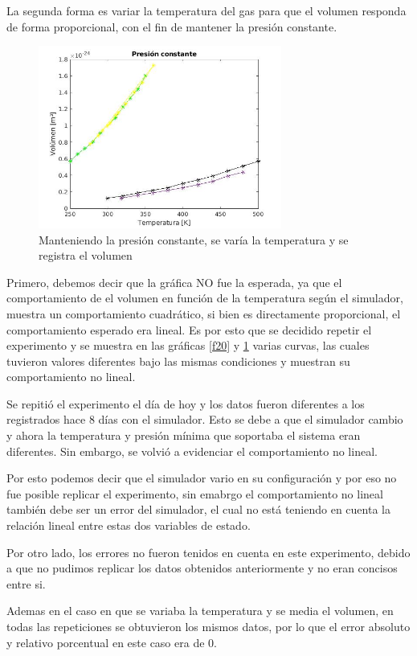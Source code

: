 \documentclass[journal,transmag]{IEEEtran}
\begin{document}
	La segunda forma es variar la temperatura del gas para que el volumen responda de forma proporcional, con el fin de mantener la presión constante.  
\begin{figure}[!h]
				\center
				\includegraphics[width=8cm]{img/precte2.jpg}
				\caption{Manteniendo la presión constante, se varía la temperatura y se registra el volumen}
				\label{f21}
	\end{figure}
	
Primero, debemos decir que la gráfica NO fue la esperada, ya que el comportamiento de el volumen en función de la temperatura según el simulador, muestra un comportamiento cuadrático, si bien es directamente proporcional, el comportamiento esperado era lineal. Es por esto que se decidido repetir el experimento y se muestra en las gráficas \ref{f20} y \ref{f21} varias curvas, las cuales tuvieron valores diferentes bajo las mismas condiciones y muestran su comportamiento no lineal.

Se repitió el experimento el día de hoy y los datos fueron diferentes a los registrados hace 8 días con el simulador. Esto se debe a que el simulador cambio y ahora la temperatura y presión mínima que soportaba el sistema eran diferentes. Sin embargo, se volvió a evidenciar el comportamiento no lineal.

Por esto podemos decir que el simulador vario en su configuración y por eso no fue posible replicar el experimento, sin emabrgo el comportamiento no lineal también debe ser un error del simulador, el cual no está teniendo en cuenta la relación lineal entre estas dos variables de estado.

Por otro lado, los errores no fueron tenidos en cuenta en este experimento, debido a que no pudimos replicar los datos obtenidos anteriormente y no eran concisos entre si.

Ademas en el caso en que se variaba la temperatura y se media el volumen, en todas las repeticiones se obtuvieron los mismos datos, por lo que el error absoluto y relativo porcentual en este caso era de 0.
\end{document}

